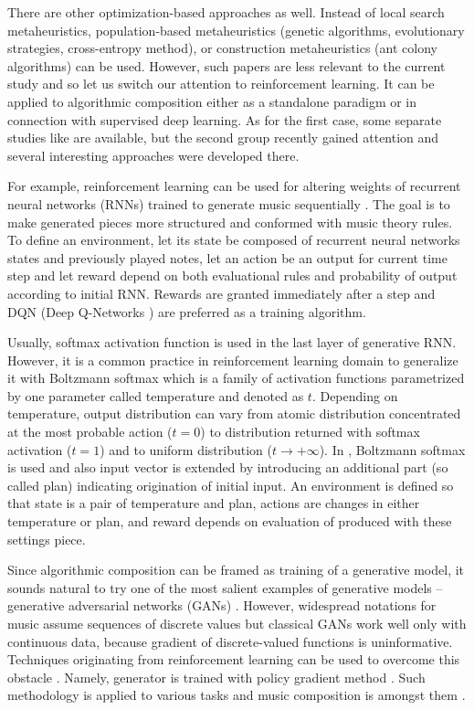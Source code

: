 \documentclass{article}
\begin{document}
There are other optimization-based approaches as well. Instead of local search metaheuristics, population-based metaheuristics (genetic algorithms, evolutionary strategies, cross-entropy method), or construction metaheuristics (ant colony algorithms) can be used. However, such papers are less relevant to the current study and so let us switch our attention to reinforcement learning. It can be applied to algorithmic composition either as a standalone paradigm or in connection with supervised deep learning. As for the first case, some separate studies like \cite{yi2007automatic, smith2012reinforcement} are available, but the second group recently gained attention and several interesting approaches were developed there.

For example, reinforcement learning can be used for altering weights of recurrent neural networks (RNNs) trained to generate music sequentially \cite{jaques2016generating, kotecha2018bach}. The goal is to make generated pieces more structured and conformed with music theory rules. To define an environment, let its state be composed of recurrent neural networks states and previously played notes, let an action be an output for current time step and let reward depend on both evaluational rules and probability of output according to initial RNN. Rewards are granted immediately after a step and DQN (Deep Q-Networks \cite{mnih2013playing}) are preferred as a training algorithm.

Usually, softmax activation function is used in the last layer of generative RNN. However, it is a common practice in reinforcement learning domain to generalize it with Boltzmann softmax which is a family of activation functions parametrized by one parameter called temperature and denoted as $t$. Depending on temperature, output distribution can vary from atomic distribution concentrated at the most probable action ($t = 0$) to distribution returned with softmax activation ($t = 1$) and to uniform distribution ($t \to +\infty$). In \cite{kumar2019polyphonic}, Boltzmann softmax is used and also input vector is extended by introducing an additional part (so called plan) indicating origination of initial input. An environment is defined so that state is a pair of temperature and plan, actions are changes in either temperature or plan, and reward depends on evaluation of produced with these settings piece.

Since algorithmic composition can be framed as training of a generative model, it sounds natural to try one of the most salient examples of generative models -- generative adversarial networks (GANs) \cite{goodfellow2014gan}. However, widespread notations for music assume sequences of discrete values but classical GANs work well only with continuous data, because gradient of discrete-valued functions is uninformative. Techniques originating from reinforcement learning can be used to overcome this obstacle \cite{yu2016seqgan,hjelm2017boundary}. Namely, generator is trained with policy gradient method \cite{williams1992simple}. Such methodology is applied to various tasks and music composition is amongst them \cite{limaguimaraes2017objective}.
\end{document}
